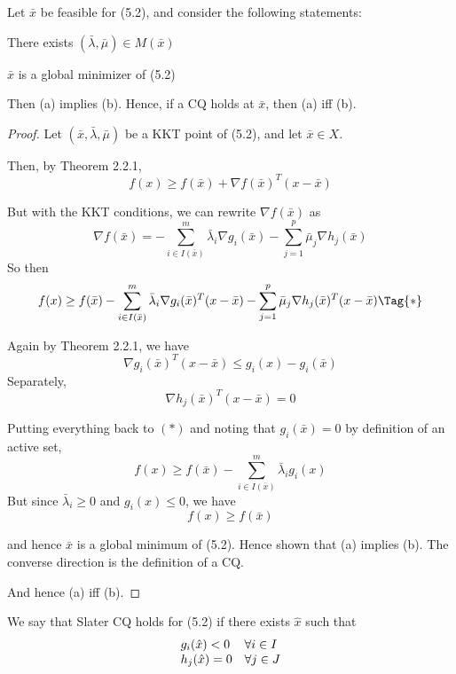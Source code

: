 
Let $\bar x$ be feasible for (5.2), and consider the following statements:
\begin{enumerata}
	\item There exists $(\bar\lambda,\bar\mu)\in M(\bar x)$
	\item $\bar x$ is a global minimizer of (5.2)
\end{enumerata}

Then (a) implies (b). Hence, if a CQ holds at $\bar x$, then (a) iff
(b).


%
%

\begin{proof}
	\def\bx{\bar x}\def\bl{\bar\lambda}\def\bm{\bar\mu}
	\def\Act{I(\bx)}
	Let $(\bx,\bl,\bm)$ be a KKT point of (5.2), and let $\bar x\in X$.

	Then, by Theorem 2.2.1,
	$$
		f(x)\geq f(\bx) + \nabla f(\bx)^T(x-\bx)
	$$

	But with the KKT conditions, we can rewrite $\nabla f(\bx)$ as
	$$
		\nabla f(\bx)=-\sum_{i\in\Act}^m\bl_i \nabla g_i(\bx)-\sum_{j=1}^p\bm_j\nabla h_j(\bx)
	$$
	So then
	\begin{align*}
		f(x)\geq f(\bx)-\sum_{i\in\Act}^m\bl_i\nabla g_i(\bx)^T(x-\bx)-\sum_{j=1}^p\bm_j\nabla h_j(\bx)^T(x-\bx)\Tag{*}
	\end{align*}

	Again by Theorem 2.2.1, we have
	$$
		\nabla g_i(\bx)^T(x-\bx)\leq g_i(x)-g_i(\bx)
	$$
	Separately,
	$$
		\nabla h_j(\bx)^T(x-\bx)=0
	$$

	Putting everything back to $(*)$ and noting that $g_i(\bar x)=0$ by
	definition of an active set,
	$$
		f(x)\geq f(\bx)-\sum_{i\in\Act}^m\bl_ig_i(x)
	$$
	But since $\bl_i\geq0$ and $g_i(x)\leq0$, we have
	$$
		f(x)\geq f(\bx)
	$$

	and hence $\bar x$ is a global minimum of (5.2). Hence shown that
	(a) implies (b). The converse direction is the definition of a CQ.

	And hence (a) iff (b).
\end{proof}


We say that Slater CQ holds for (5.2) if there exists $\hat x$ such that
$$
	\begin{array}{l l}
		g_i(\hat x)<0 & \forall i\in I \\
		h_j(\hat x)=0 & \forall j\in J
	\end{array}
$$


